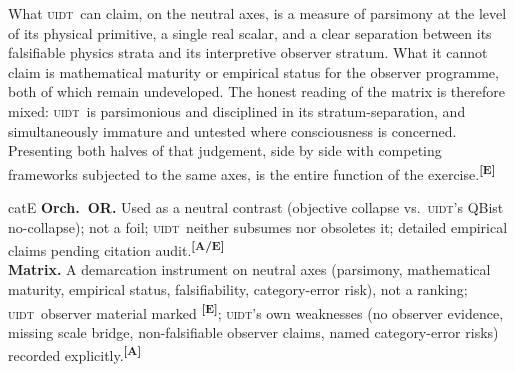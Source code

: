 \documentclass[12pt,a4paper,twoside]{article}
\theoremstyle{plain}
\theoremstyle{definition}
\theoremstyle{remark}
\newcommand{\UIDT}{\textsc{uidt}}
\newcommand{\catmark}[1]{\textsuperscript{\textsf{\textbf{[#1]}}}}
\begin{document}
What \UIDT\ can claim, on the neutral axes, is a measure of parsimony at the level of its physical primitive, a single real scalar, and a clear separation between its falsifiable physics strata and its interpretive observer stratum. What it cannot claim is mathematical maturity or empirical status for the observer programme, both of which remain undeveloped. The honest reading of the matrix is therefore mixed: \UIDT\ is parsimonious and disciplined in its stratum-separation, and simultaneously immature and untested where consciousness is concerned. Presenting both halves of that judgement, side by side with competing frameworks subjected to the same axes, is the entire function of the exercise.\catmark{E}

\begin{evidencebox}{catE}
\textbf{Orch.\ OR.} Used as a neutral contrast (objective collapse vs.\ \UIDT's QBist no-collapse); not a foil; \UIDT\ neither subsumes nor obsoletes it; detailed
empirical claims pending citation audit.\catmark{A/E}\\[0.3em]
\textbf{Matrix.} A demarcation instrument on neutral axes (parsimony, mathematical maturity, empirical status, falsifiability, category-error risk), not a ranking; \UIDT\ observer material marked \catmark{E}; \UIDT's own weaknesses (no observer evidence, missing scale bridge, non-falsifiable observer claims, named category-error risks) recorded explicitly.\catmark{A}
\end{evidencebox}

\end{document}
